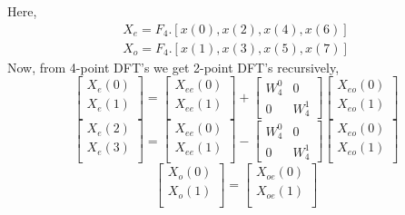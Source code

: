 \documentclass[journal,12pt,twocolumn]{IEEEtran}
\renewcommand\thesection{\arabic{section}}
\begin{document}
\begin{enumerate}[label=\thesection.\arabic*.,ref=\thesection.\theenumi]
Here, 
\begin{align}
    X_{e} = F_{4}.[x(0),x(2),x(4),x(6)] \\
    X_{o} = F_{4}.[x(1),x(3),x(5),x(7)]
\end{align}
Now, from 4-point DFT's we get 2-point DFT's recursively,
\begin{equation}
\begin{bmatrix}
X_{e}(0) \\ 
X_{e}(1)\\ 
\end{bmatrix}
=
\begin{bmatrix}
X_{ee}(0) \\ 
X_{ee}(1)\\ 
\end{bmatrix}
+
\begin{bmatrix}
W^{0}_{4} & 0\\
0 & W^{1}_{4}
\end{bmatrix}
\begin{bmatrix}
X_{eo}(0) \\ 
X_{eo}(1) \\ 
\end{bmatrix}
\end{equation}
\begin{equation}
\begin{bmatrix}
X_{e}(2) \\ 
X_{e}(3)\\ 
\end{bmatrix}
=
\begin{bmatrix}
X_{ee}(0) \\ 
X_{ee}(1)\\ 
\end{bmatrix}
-
\begin{bmatrix}
W^{0}_{4} & 0\\
0 & W^{1}_{4}
\end{bmatrix}
\begin{bmatrix}
X_{eo}(0) \\ 
X_{eo}(1) \\ 
\end{bmatrix}
\end{equation}
\begin{equation}
\begin{bmatrix}
X_{o}(0) \\ 
X_{o}(1)\\ 
\end{bmatrix}
=
\begin{bmatrix}
X_{oe}(0) \\ 
X_{oe}(1)\\ 

\end{bmatrix}
\end{equation}
\end{enumerate}
\end{document}
